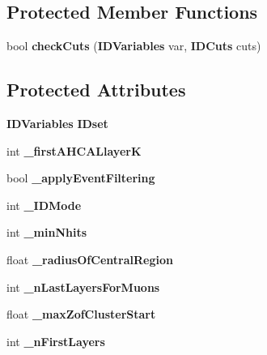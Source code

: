 \subsection*{Protected Member Functions}
\begin{DoxyCompactItemize}
\item 
bool {\bfseries check\-Cuts} ({\bf I\-D\-Variables} var, {\bf I\-D\-Cuts} cuts)\label{classCALICE_1_1TBParticleID_a78800c66439da5a558daf8ab9348f7d7}

\end{DoxyCompactItemize}
\subsection*{Protected Attributes}
\begin{DoxyCompactItemize}
\item 
{\bf I\-D\-Variables} {\bfseries I\-Dset}\label{classCALICE_1_1TBParticleID_af4b5bde6f0934f812d762cf9abd9dcfd}

\item 
int {\bfseries \-\_\-first\-A\-H\-C\-A\-Llayer\-K}\label{classCALICE_1_1TBParticleID_ae8984f067424aeabf28008956022247c}

\item 
bool {\bfseries \-\_\-apply\-Event\-Filtering}\label{classCALICE_1_1TBParticleID_aa254187a280d25a15c97d87fb39afbd4}

\item 
int {\bfseries \-\_\-\-I\-D\-Mode}\label{classCALICE_1_1TBParticleID_a6be651c4ff2f75af110ac1053b04734c}

\item 
int {\bfseries \-\_\-min\-Nhits}\label{classCALICE_1_1TBParticleID_ab8677ab8b866fab988c6250e76119bc1}

\item 
float {\bfseries \-\_\-radius\-Of\-Central\-Region}\label{classCALICE_1_1TBParticleID_a9737ef4957d21523e7bdc4ab3d30c325}

\item 
int {\bfseries \-\_\-n\-Last\-Layers\-For\-Muons}\label{classCALICE_1_1TBParticleID_a06a8b150c9da9dccc331a8c44a950818}

\item 
float {\bfseries \-\_\-max\-Zof\-Cluster\-Start}\label{classCALICE_1_1TBParticleID_a54759dd0fbce39fb79de313f2e0f459f}

\item 
int {\bfseries \-\_\-n\-First\-Layers}\label{classCALICE_1_1TBParticleID_abe41f40368774c27b8329c2cf569e340}


\end{DoxyCompactItemize}
